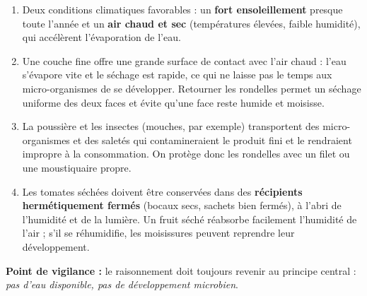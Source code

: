 \documentclass[11pt]{article}
\begin{document}
\begin{corrige}
\begin{enumerate}
\item Deux conditions climatiques favorables : un \textbf{fort ensoleillement} presque toute l'année et un \textbf{air chaud et sec} (températures élevées, faible humidité), qui accélèrent l'évaporation de l'eau.
\item Une couche fine offre une grande surface de contact avec l'air chaud : l'eau s'évapore vite et le séchage est rapide, ce qui ne laisse pas le temps aux micro-organismes de se développer. Retourner les rondelles permet un séchage uniforme des deux faces et évite qu'une face reste humide et moisisse.
\item La poussière et les insectes (mouches, par exemple) transportent des micro-organismes et des saletés qui contamineraient le produit fini et le rendraient impropre à la consommation. On protège donc les rondelles avec un filet ou une moustiquaire propre.
\item Les tomates séchées doivent être conservées dans des \textbf{récipients hermétiquement fermés} (bocaux secs, sachets bien fermés), à l'abri de l'humidité et de la lumière. Un fruit séché réabsorbe facilement l'humidité de l'air ; s'il se réhumidifie, les moisissures peuvent reprendre leur développement.
\end{enumerate}
\textbf{Point de vigilance :} le raisonnement doit toujours revenir au principe central : \emph{pas d'eau disponible, pas de développement microbien}.
\end{corrige}
\end{document}
